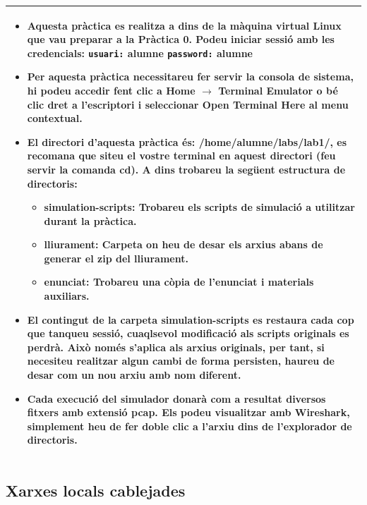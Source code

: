 \documentclass[12pt,a4paper]{article}
\begin{document}
 \begin{tabular}{||p{12cm}||}
 \hline\hline
 \begin{itemize}
 \item Aquesta pràctica es realitza a dins de la màquina virtual Linux que vau preparar a la Pràctica 0. Podeu iniciar sessió amb les credencials: 
   \newline \texttt{usuari:} \textbf{alumne}
   \newline \texttt{password:} \textbf{alumne}
 \item Per aquesta pràctica necessitareu fer servir la consola de sistema, hi podeu accedir fent clic a \textbf{Home} $\rightarrow$ \textbf{Terminal Emulator} o bé clic dret a l'escriptori i seleccionar \textbf{Open Terminal Here} al menu contextual.
 
 \item El directori d'aquesta pràctica és: \textbf{/home/alumne/labs/lab1/}, es recomana que siteu el vostre terminal en aquest directori (feu servir la comanda \textbf{cd}). A dins trobareu la següent estructura de directoris:
    \begin{itemize}        
        \item\textbf{simulation-scripts}: Trobareu els scripts de simulació a utilitzar durant la pràctica.
        \item\textbf{lliurament}: Carpeta on heu de desar els arxius abans de generar el zip del lliurament.
        \item\textbf{enunciat}: Trobareu una còpia de l'enunciat i materials auxiliars.
    \end{itemize}
 
 \item El contingut de la carpeta \textbf{simulation-scripts} es restaura cada cop que tanqueu sessió, cuaqlsevol modificació als scripts originals es perdrà. Això només s'aplica als arxius originals, per tant, si necesiteu realitzar algun cambi de forma persisten, haureu de desar com un nou arxiu amb nom diferent.
 
 \item Cada execució del simulador donarà com a resultat diversos fitxers amb extensió \textbf{pcap}. Els podeu visualitzar amb \textbf{Wireshark}, simplement heu de fer doble clic a l'arxiu dins de l'explorador de directoris.  
 \end{itemize}
 \\\hline\hline
 \end{tabular}
 \medskip
 
\subsection{Xarxes locals cablejades}
\end{document}
